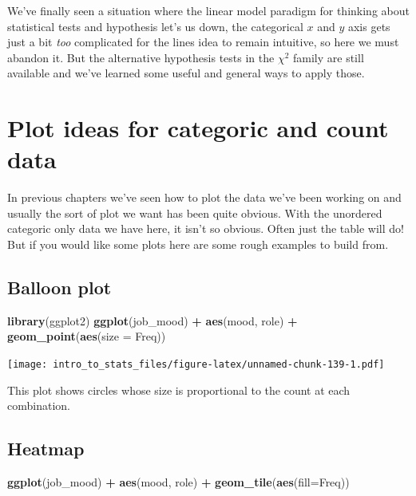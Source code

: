 \documentclass[
]{book}
\newenvironment{Shaded}{\begin{snugshade}}{\end{snugshade}}
\newcommand{\DataTypeTok}[1]{\textcolor[rgb]{0.13,0.29,0.53}{#1}}
\newcommand{\KeywordTok}[1]{\textcolor[rgb]{0.13,0.29,0.53}{\textbf{#1}}}
\newcommand{\NormalTok}[1]{#1}
\newcommand{\OperatorTok}[1]{\textcolor[rgb]{0.81,0.36,0.00}{\textbf{#1}}}
\newcommand{\StringTok}[1]{\textcolor[rgb]{0.31,0.60,0.02}{#1}}
\begin{document}
We've finally seen a situation where the linear model paradigm for thinking about statistical tests and hypothesis let's us down, the categorical \(x\) and \(y\) axis gets just a bit \emph{too} complicated for the lines idea to remain intuitive, so here we must abandon it. But the alternative hypothesis tests in the \(\chi^2\) family are still available and we've learned some useful and general ways to apply those.

\hypertarget{plot-ideas-for-categoric-and-count-data}{%
\section{Plot ideas for categoric and count data}\label{plot-ideas-for-categoric-and-count-data}}

In previous chapters we've seen how to plot the data we've been working on and usually the sort of plot we want has been quite obvious. With the unordered categoric only data we have here, it isn't so obvious. Often just the table will do! But if you would like some plots here are some rough examples to build from.

\hypertarget{balloon-plot}{%
\subsection{Balloon plot}\label{balloon-plot}}

\begin{Shaded}
\begin{Highlighting}[]
\KeywordTok{library}\NormalTok{(ggplot2)}
\KeywordTok{ggplot}\NormalTok{(job_mood) }\OperatorTok{+}\StringTok{ }\KeywordTok{aes}\NormalTok{(mood, role) }\OperatorTok{+}\StringTok{ }\KeywordTok{geom_point}\NormalTok{(}\KeywordTok{aes}\NormalTok{(}\DataTypeTok{size =}\NormalTok{ Freq))}
\end{Highlighting}
\end{Shaded}

\texttt{[image: intro\_to\_stats\_files/figure-latex/unnamed-chunk-139-1.pdf]}

This plot shows circles whose size is proportional to the count at each combination.

\hypertarget{heatmap}{%
\subsection{Heatmap}\label{heatmap}}

\begin{Shaded}
\begin{Highlighting}[]
\KeywordTok{ggplot}\NormalTok{(job_mood) }\OperatorTok{+}\StringTok{ }\KeywordTok{aes}\NormalTok{(mood, role) }\OperatorTok{+}\StringTok{ }\KeywordTok{geom_tile}\NormalTok{(}\KeywordTok{aes}\NormalTok{(}\DataTypeTok{fill=}\NormalTok{Freq))}
\end{Highlighting}
\end{Shaded}
\end{document}
